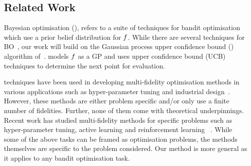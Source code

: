 \vspace{-0.17in}

\subsection*{Related Work}
\vspace{-0.07in}

Bayesian optimisation (\bayo), refers to a suite of techniques for bandit optimisation
which use a prior belief distribution for $f$.
While there are several techniques for
BO~\citep{mockus94bo,jones98expensive,thompson33sampling,lobato14pes,defreitas12expregret},
our work will build on the 
Gaussian process upper confidence bound (\gpucb) algorithm
of~\citet{srinivas10gpbandits}.
\gpucbs models $f$ as a GP and uses upper confidence bound (UCB)~\citep{auer03ucb}
techniques to determine the next point for evaluation.

\bayo{} techniques have been used in developing multi-fidelity optimisation methods
in various applications such as hyper-parameter tuning and industrial
design~\citep{huang06mfKriging,swersky2013multi,klein2015towards,forrester07cokriging,%
poloczek2016multi}.
However, these methods are either problem specific and/or only use a finite
number of fidelities.
Further, none of them come with theoretical underpinnings.
Recent work has studied multi-fidelity methods for specific problems 
such as hyper-parameter tuning, active learning and
reinforcement learning%
~\citep{agarwal2011oracle,sabharwal2015selecting,cutler14mfsim,zhang15weakAndStrong,%
li2016hyperband}.
While some of the above tasks can be framed as optimisation problems, the methods
themselves are specific to the problem considered.
Our method is more general as it applies to any bandit optimisation task.


